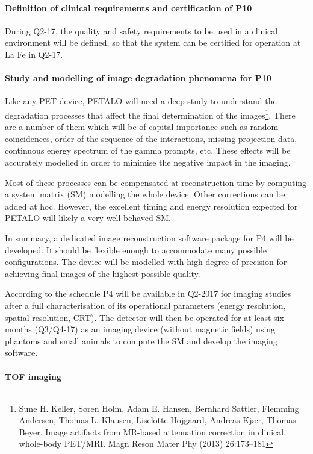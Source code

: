 \paragraph{Definition of clinical requirements and certification of P10}
During Q2-17, the quality and safety requirements to be used in a clinical environment will be defined, so that the system can be certified for operation at La Fe in Q2-17.

\paragraph{Study and modelling of image degradation phenomena for P10}

Like any PET device, PETALO will need a deep study to understand the  
degradation processes that affect the final determination of the images\footnote{Sune H. Keller,  Søren Holm, Adam E. Hansen, Bernhard Sattler, Flemming Andersen, Thomas L. Klausen, Liselotte Hojgaard,  Andreas Kjær, Thomas Beyer. Image artifacts from MR-based attenuation correction in clinical, whole-body PET/MRI. Magn Reson Mater Phy (2013) 26:173–181}. There are a number of them which will be of capital importance such as random coincidences, order of the sequence of the interactions, missing projection data, continuous energy spectrum of the gamma prompts, etc. These effects will be accurately modelled in order to minimise the negative impact in the imaging.

Most of these processes can be compensated at reconstruction time by computing a system matrix (SM) modelling the whole device. Other corrections can be added at hoc. However, the excellent timing and energy resolution expected for PETALO will likely a very well behaved SM. 

In summary, a dedicated image reconstruction software package for P4 will be developed. It should be flexible enough to accommodate many possible configurations. The device will be modelled with high degree of precision for achieving final images of the highest possible quality. 

According to the schedule P4 will be available in Q2-2017 for imaging studies after a full characterisation of its operational parameters (energy resolution, spatial resolution, CRT). The detector will then be operated for at least six months (Q3/Q4-17) as an imaging device (without magnetic fields) using phantoms and small animals to compute the SM and develop the imaging software.  

\paragraph{TOF imaging}

